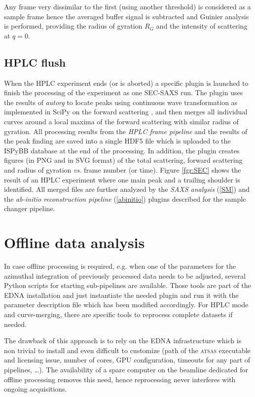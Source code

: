 \documentclass[preprint,pdf]{iucr}              %
\begin{document}
Any frame very dissimilar to the first (using another threshold) is considered
as a sample frame hence the averaged buffer signal is subtracted and Guinier
analysis is performed, providing the radius of gyration $R_G$ and the
intensity of scattering at $q=0$.

\subsection{HPLC flush}
When the HPLC experiment ends (or is aborted) a specific plugin is launched to
finish the processing of the experiment as one SEC-SAXS run.
The plugin uses the results of \textit{autorg} to locate peaks using continuous
wave transformation as implemented in SciPy on the forward scattering
\cite{cwt,scipy}, and then merges all individual curves around a local maxima
of the forward scattering with similar radius of gyration.
All processing results from the \textit{HPLC frame pipeline} and the results of
the peak finding are saved into a single HDF5 file which is uploaded to the
ISPyBB database at the end of the processing.
In addition, the plugin creates figures (in PNG and in SVG format) of the
total scattering, forward scattering and radius of gyration \textit{vs.} frame
number (or time).
Figure \ref{fgr:SEC} shows the result of an HPLC
experiment where one main peak and a trailing shoulder is identified.
All merged files are further analyzed by the \textit{SAXS analysis}
(\ref{SM}) and the \textit{ab-initio reconstruction pipeline}
(\ref{abinitio}) plugins described for the sample changer pipeline.

\section{Offline data analysis}
In case offline processing is required, e.g. when one of the parameters for
the azimuthal integration of previously processed data needs to be adjusted,
several Python scripts for starting sub-pipelines are available.
Those tools are part of the EDNA installation and just instantiate the needed
plugin and run it with the parameter description file which has been modified
accordingly.
For HPLC mode and curve-merging, there are specific tools to reprocess complete
datasets if needed.

The drawback of this approach is to rely on the EDNA infrastructure which is
non trivial to install and even difficult to customize (path of the
\textsc{atsas} executable and licensing issue, number of cores, GPU
configuration, timeouts for any part of pipelines, \ldots).
The availability of a spare computer on the beamline dedicated for offline
processing removes this need, hence reprocessing never interferes with ongoing
acquisitions.
\end{document}
